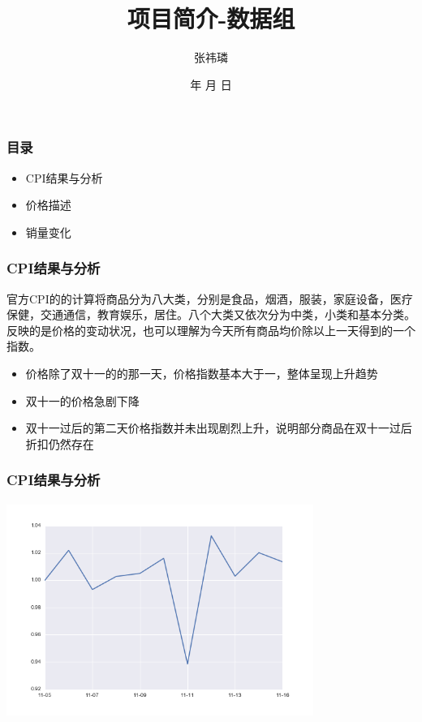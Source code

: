 \documentclass{beamer}
\begin{document}
\title{项目简介-数据组}

\author{张祎璘}


\renewcommand{\today}{\number\year 年 \number\month 月 \number\day 日}
\date{\today} 

\subject{Presentations}

\begin{frame}
\titlepage
\end{frame}

\begin{frame}
\frametitle{目录}
\begin{itemize}
  \item CPI结果与分析
  \item 价格描述 
  \item 销量变化
\end{itemize}
\end{frame}

\begin{frame}
\frametitle{CPI结果与分析}
官方CPI的的计算将商品分为八大类，分别是食品，烟酒，服装，家庭设备，医疗保健，交通通信，教育娱乐，居住。八个大类又依次分为中类，小类和基本分类。反映的是价格的变动状况，也可以理解为今天所有商品均价除以上一天得到的一个指数。
\begin{itemize} 
  \item 价格除了双十一的的那一天，价格指数基本大于一，整体呈现上升趋势
  \item 双十一的价格急剧下降
  \item 双十一过后的第二天价格指数并未出现剧烈上升，说明部分商品在双十一过后折扣仍然存在
\end{itemize}
\end{frame}

\begin{frame}
\frametitle{CPI结果与分析}
\includegraphics[width=10cm,height=7cm]{double11_totalindex.png}
\end{frame} 
\end{document}
